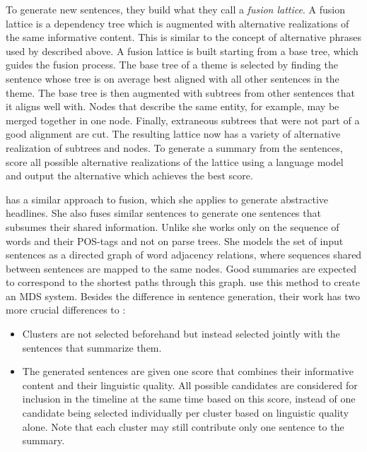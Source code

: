 \documentclass[a4paper,BCOR=10mm]{report}
\numberwithin{lemma}{chapter}
\numberwithin{definition}{chapter}
\begin{document}
To generate new sentences, they build what they call a \textit{fusion lattice}. A fusion lattice is a dependency tree which is augmented with alternative realizations of the same informative content. This is similar to the concept of alternative phrases used by \citet{bing} described above.
A fusion lattice is built starting from a base tree, which guides the fusion process. The base tree of a theme is selected by finding the sentence whose tree is on average best aligned with all other sentences in the theme.
The base tree is then augmented with subtrees from other sentences that it aligns well with. Nodes that describe the same entity, for example, may be merged together in one node. Finally, extraneous subtrees that were not part of a good alignment are cut.
The resulting lattice now has a variety of alternative realization of subtrees and nodes.
To generate a summary from the sentences, \citeauthor{barzilay+mckeown} score all possible alternative realizations of the lattice using a language model and output the alternative which achieves the best score.

\citet{filippova} has a similar approach to fusion, which she applies to generate abstractive headlines. She also fuses similar sentences to generate one sentences that subsumes their shared information. Unlike \citet{barzilay+mckeown} she works only on the sequence of words and their POS-tags and not on parse trees. She models the set of input sentences as a directed graph of word adjacency relations, where sequences shared between sentences are mapped to the same nodes. Good summaries are expected to correspond to the shortest paths through this graph.
\citet{banerjee} use this method to create an MDS system. Besides the difference in sentence generation, their work has two more crucial differences to \citeauthor{barzilay+mckeown}:

\begin{itemize}
    \item{Clusters are not selected beforehand but instead selected jointly with the sentences that summarize them.}
    \item{The generated sentences are given one score that combines their informative content and their linguistic quality. All possible candidates are considered for inclusion in the timeline at the same time based on this score, instead of one candidate being selected individually per cluster based on linguistic quality alone. Note that each cluster may still contribute only one sentence to the summary.}
\end{itemize}
\end{document}
